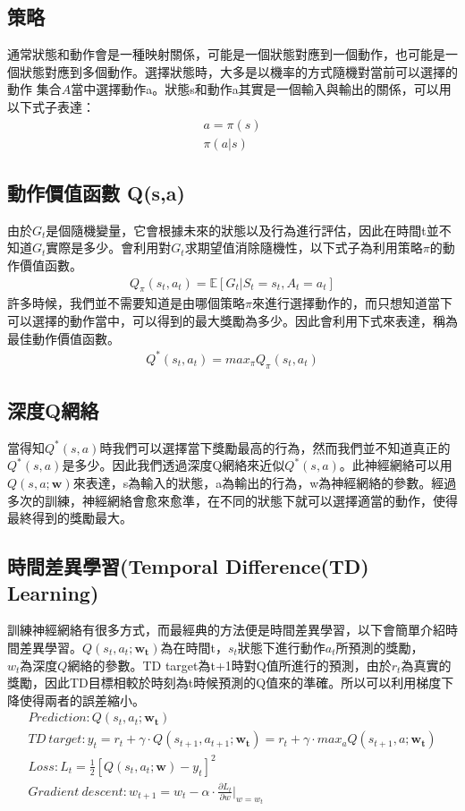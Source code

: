 \documentclass[a4paper,12pt]{article}
\begin{document}
\subsection{策略}
\qquad 通常狀態和動作會是一種映射關係，可能是一個狀態對應到一個動作，也可能是一個狀態對應到多個動作。選擇狀態時，大多是以機率的方式隨機對當前可以選擇的動作
集合$A$當中選擇動作a。狀態s和動作a其實是一個輸入與輸出的關係，可以用以下式子表達：
\begin{align}
a = \pi(s)\nonumber\\
\pi(a|s)\nonumber
\end{align}
\subsection{動作價值函數 Q(s,a)}
\qquad 由於$G_{t}$是個隨機變量，它會根據未來的狀態以及行為進行評估，因此在時間t並不知道$G_{t}$實際是多少。會利用對$G_{t}$求期望值消除隨機性，以下式子為利用策略$\pi$的動作價值函數。
\begin{align}
Q_{\pi}(s_{t},a_{t})=\mathbb{E}[G_{t}|S_{t}=s_{t},A_{t}=a_{t}]\nonumber
\end{align}
\quad 許多時候，我們並不需要知道是由哪個策略$\pi$來進行選擇動作的，而只想知道當下可以選擇的動作當中，可以得到的最大獎勵為多少。因此會利用下式來表達，稱為最佳動作價值函數。\newline
\begin{align}
Q^{*}(s_{t},a_{t})=max_{\pi}Q_{\pi}(s_{t},a_{t})\nonumber
\end{align}
\subsection{深度Q網絡}
\qquad 當得知$Q^{*}(s,a)$時我們可以選擇當下獎勵最高的行為，然而我們並不知道真正的$Q^{*}(s,a)$是多少。因此我們透過深度Q網絡來近似$Q^{*}(s,a)$。此神經網絡可以用$Q(s,a;\mathbf{w})$來表達，s為輸入的狀態，a為輸出的行為，w為神經網絡的參數。經過多次的訓練，神經網絡會愈來愈準，在不同的狀態下就可以選擇適當的動作，使得最終得到的獎勵最大。
\subsection{時間差異學習(Temporal Difference(TD) Learning)}
\qquad 訓練神經網絡有很多方式，而最經典的方法便是時間差異學習，以下會簡單介紹時間差異學習。$Q(s_{t},a_{t};\mathbf{w_{t}})$為在時間t，$s_{t}$狀態下進行動作$a_{t}$所預測的獎勵，$w_{t}為深度Q網絡的參數$。TD target為t+1時對Q值所進行的預測，由於$r_{t}$為真實的獎勵，因此TD目標相較於時刻為t時候預測的Q值來的準確。所以可以利用梯度下降使得兩者的誤差縮小。
\begin{align}
&Prediction:Q(s_{t},a_{t};\mathbf{w_{t}})&\nonumber\\
& TD\ target:y_{t}=r_{t}+\gamma \cdot Q(s_{t+1},a_{t+1};\mathbf{w_{t}}) =r_{t}+\gamma \cdot max_{a}Q(s_{t+1},a;\mathbf{w_{t}})&\nonumber\\
& Loss:L_{t}=\frac{1}{2}[Q(s_{t},a_{t};\mathbf{w})-y_{t}]^{2}&\nonumber\\
& Gradient\ descent:w_{t+1}=w_{t}-\alpha \cdot \frac{\partial L_{t}}{\partial w}{|}_{w=w_{t}}&\nonumber
\end{align}
\end{document}
